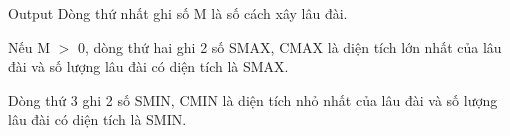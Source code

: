 Output
Dòng thứ nhất ghi số M là số cách xây lâu đài.


Nếu M $>$ 0, dòng thứ hai ghi 2 số SMAX, CMAX là diện tích lớn nhất của lâu đài và số lượng lâu đài có diện tích là SMAX.


Dòng thứ 3 ghi 2 số SMIN, CMIN là diện tích nhỏ nhất của lâu đài và số lượng lâu đài có diện tích là SMIN.